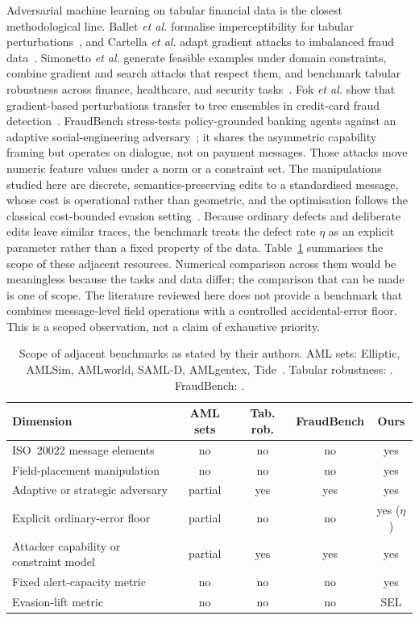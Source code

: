 \documentclass[conference]{IEEEtran}
\begin{document}
Adversarial machine learning on tabular financial data is the closest
methodological line. Ballet \emph{et al.} formalise imperceptibility for
tabular perturbations~\cite{ballet2019}, and Cartella \emph{et al.} adapt
gradient attacks to imbalanced fraud data~\cite{cartella2021}. Simonetto
\emph{et al.} generate feasible examples under domain constraints, combine
gradient and search attacks that respect them, and benchmark tabular
robustness across finance, healthcare, and security
tasks~\cite{simonetto2022,simonetto2024caa,simonetto2024}. Fok
\emph{et al.} show that gradient-based perturbations transfer to tree
ensembles in credit-card fraud detection~\cite{fok2025}. FraudBench
stress-tests policy-grounded banking agents against an adaptive
social-engineering adversary~\cite{pai2026}; it shares the asymmetric
capability framing but operates on dialogue, not on payment messages. Those attacks move numeric feature values under a
norm or a constraint set. The manipulations studied here are discrete,
semantics-preserving edits to a standardised message, whose cost is
operational rather than geometric, and the optimisation follows the classical
cost-bounded evasion setting~\cite{bruckner2011,biggio2013}. Because ordinary
defects and deliberate edits leave similar traces, the benchmark treats the
defect rate $\eta$ as an explicit parameter rather than a fixed property of
the data. Table~\ref{tab:scope} summarises the scope of these adjacent resources.
Numerical comparison across them would be meaningless because the tasks and
data differ; the comparison that can be made is one of scope. The literature
reviewed here does not provide a benchmark that combines message-level field
operations with a controlled accidental-error floor. This is a scoped
observation, not a claim of exhaustive priority.

\begin{table}[!t]
\caption{Scope of adjacent benchmarks as stated by their authors. AML sets:
Elliptic, AMLSim, AMLworld, SAML-D, AMLgentex, Tide~\cite{weber2019,
suzumura2021,altman2023,oztas2023,ostman2025,beukel2026}. Tabular
robustness: \cite{ballet2019,cartella2021,simonetto2022,simonetto2024caa,
simonetto2024}. FraudBench: \cite{pai2026}.}
\label{tab:scope}
\centering
\scriptsize
\begin{tabularx}{\columnwidth}{@{}Xcccc@{}}
\toprule
Dimension & AML sets & Tab. rob. & FraudBench & Ours \\
\midrule
ISO~20022 message elements & no & no & no & yes \\
Field-placement manipulation & no & no & no & yes \\
Adaptive or strategic adversary & partial & yes & yes & yes \\
Explicit ordinary-error floor & partial & no & no & yes ($\eta$) \\
Attacker capability or constraint model & partial & yes & yes & yes \\
Fixed alert-capacity metric & no & no & no & yes \\
Evasion-lift metric & no & no & no & SEL \\
\bottomrule
\end{tabularx}
\end{table}
\end{document}
